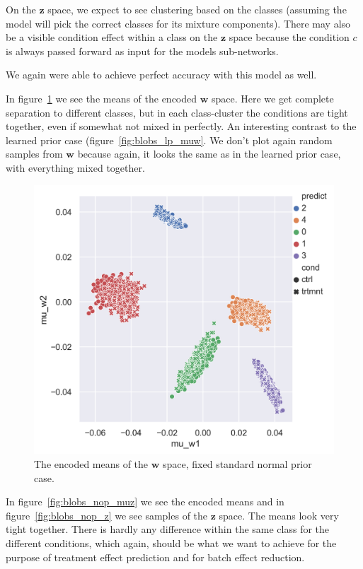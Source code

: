 \documentclass[11pt, a4paper]{report}
\theoremstyle{plain}
\theoremstyle{definition}
\theoremstyle{remark}
\newcommand{\z}{\mathbf{z}}
\newcommand{\w}{\mathbf{w}}
\begin{document}
On the $\z$ space, we expect to see clustering based on the classes (assuming
the model will pick the correct classes for its mixture components).
There may also be a visible condition effect within a class on the $\z$ space
because the condition $c$ is always passed forward as input for the models
sub-networks.

We again were able to achieve perfect accuracy with this model as well.

In figure~\ref{fig:blobs_nop_muw} we see the means of the encoded $\w$ space.
Here we get complete separation to different classes, but in each class-cluster
the conditions are tight together, even if somewhat not mixed in perfectly.
An interesting contrast to the learned prior case
(figure~\ref{fig:blobs_lp_muw}.
We don't plot again random samples from $\w$ because again, it looks the same 
as in the learned prior case, with everything mixed together.

\begin{figure}[h]
\centering
\includegraphics[width=1.1\textwidth]{images/blobs_cgmvae_stdprior_mu_w.png}
\caption{The encoded means of the $\w$ space, fixed standard normal prior case.
}
\label{fig:blobs_nop_muw}
\end{figure}

In figure~\ref{fig:blobs_nop_muz} we see the encoded means and in
figure~\ref{fig:blobs_nop_z} we see samples of the $\z$ space. The means look
very tight together. There is hardly any difference within  the same class for
the different conditions, which again, should be what we want to achieve for the
purpose of treatment effect prediction and for batch effect reduction.
\end{document}
